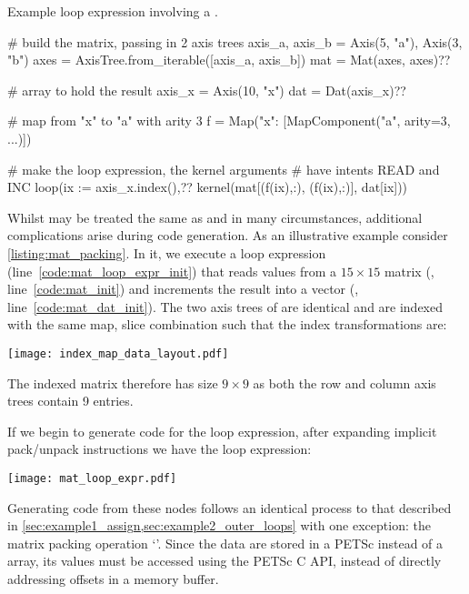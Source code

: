 \documentclass[thesis]{subfiles}
\begin{document}
\begin{listing}
  \caption{
    Example loop expression involving a .
  }
  \centering
  \begin{minipage}{.9\textwidth}
    \begin{pyalg2}
      # build the matrix, passing in 2 axis trees
      axis_a, axis_b = Axis(5, "a"), Axis(3, "b")
      axes = AxisTree.from_iterable([axis_a, axis_b])
      mat = Mat(axes, axes)?\label{code:mat_init}?

      # array to hold the result
      axis_x = Axis(10, "x")
      dat = Dat(axis_x)?\label{code:mat_dat_init}?

      # map from "x" to "a" with arity 3
      f = Map({"x": [MapComponent("a", arity=3, ...)]})

      # make the loop expression, the kernel arguments
      # have intents READ and INC
      loop(ix := axis_x.index(),?\label{code:mat_loop_expr_init}?
           kernel(mat[(f(ix),:), (f(ix),:)], dat[ix]))
    \end{pyalg2}
  \end{minipage}
  \label{listing:mat_packing}
\end{listing}

Whilst  may be treated the same as  and  in many circumstances, additional complications arise during code generation.
As an illustrative example consider \cref{listing:mat_packing}.
In it, we execute a loop expression (line~\ref{code:mat_loop_expr_init}) that reads values from a $15 \times 15$ matrix (, line~\ref{code:mat_init}) and increments the result into a vector (, line~\ref{code:mat_dat_init}).
The two axis trees of  are identical and are indexed with the same map, slice combination such that the index transformations are:
\begin{center}
  \texttt{[image: index\_map\_data\_layout.pdf]}
\end{center}
The indexed matrix therefore has size $9 \times 9$ as both the row and column axis trees contain 9 entries.

If we begin to generate code for the loop expression, after expanding implicit pack/unpack instructions we have the loop expression:
\begin{center}
  \texttt{[image: mat\_loop\_expr.pdf]}
\end{center}
Generating code from these nodes follows an identical process to that described in \cref{sec:example1_assign,sec:example2_outer_loops} with one exception: the matrix packing operation `'.
Since the data are stored in a PETSc  instead of a \numpy{} array, its values must be accessed using the PETSc C API, instead of directly addressing offsets in a memory buffer.
\end{document}
